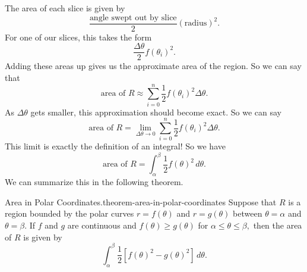\documentclass[10pt,]{book}
\numberwithin{equation}{section}
\begin{document}
\hypertarget{p-1041}{}%
The area of each slice is given by%
%
\begin{equation*}
\frac{\text{angle swept out by slice}}{2}(\text{radius})^{2}.
\end{equation*}
\hypertarget{p-1042}{}%
For one of our slices, this takes the form%
%
\begin{equation*}
\frac{\Delta\theta}{2}f(\theta_{i})^{2}.
\end{equation*}
\hypertarget{p-1043}{}%
Adding these areas up gives us the approximate area of the region. So we can say that%
%
\begin{equation*}
\text{area of }R \approx \sum_{i=0}^{n}\frac{1}{2}f(\theta_{i})^{2}\Delta\theta.
\end{equation*}
\hypertarget{p-1044}{}%
As \(\Delta\theta\) gets smaller, this approximation should become exact. So we can say%
%
\begin{equation*}
\text{area of }R = \lim_{\Delta\theta\to0}\sum_{i=0}^{n}\frac{1}{2}f(\theta_{i})^{2}\Delta\theta.
\end{equation*}
\hypertarget{p-1045}{}%
This limit is exactly the definition of an integral! So we have%
%
\begin{equation*}
\text{area of }R = \int_{\alpha}^{\beta}\frac{1}{2}f(\theta)^{2}\,d\theta.
\end{equation*}
\hypertarget{p-1046}{}%
We can summarize this in the following theorem.%
\begin{theorem}{Area in Polar Coordinates.}{}{theorem-area-in-polar-coordinates}%
\hypertarget{p-1047}{}%
Suppose that \(R\) is a region bounded by the polar curves \(r=f(\theta)\) and \(r=g(\theta)\) between \(\theta = \alpha\) and \(\theta=\beta\). If \(f\) and \(g\) are continuous and \(f(\theta)\geq g(\theta)\) for \(\alpha\leq\theta\leq\beta,\) then the area of \(R\) is given by%
\begin{equation*}
\int_{\alpha}^{\beta}\frac{1}{2}[f(\theta)^{2}-g(\theta)^{2}]\,d\theta.
\end{equation*}
%
\end{theorem}
\end{document}
